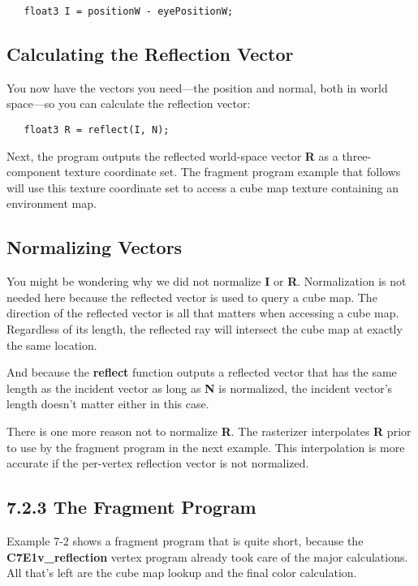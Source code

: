 \documentclass[../main.tex]{subfiles}
\begin{document}
\FloatBarrier
\begin{lstlisting}
   float3 I = positionW - eyePositionW;
\end{lstlisting}
\FloatBarrier
   
\subsection*{Calculating the Reflection Vector}

You now have the vectors you need—the position and normal, both in world space—so you can calculate the reflection vector:

\FloatBarrier
\begin{lstlisting}
   float3 R = reflect(I, N);
\end{lstlisting}
\FloatBarrier
   
Next, the program outputs the reflected world-space vector \textbf{R} as a three-component texture coordinate set. The fragment program example that follows will use this texture coordinate set to access a cube map texture containing an environment map.

\subsection*{Normalizing Vectors}

You might be wondering why we did not normalize \textbf{I} or \textbf{R}. Normalization is not needed here because the reflected vector is used to query a cube map. The direction of the reflected vector is all that matters when accessing a cube map. Regardless of its length, the reflected ray will intersect the cube map at exactly the same location.

And because the \textbf{reflect} function outputs a reflected vector that has the same length as the incident vector as long as \textbf{N} is normalized, the incident vector's length doesn't matter either in this case.

There is one more reason not to normalize \textbf{R}. The rasterizer interpolates \textbf{R} prior to use by the fragment program in the next example. This interpolation is more accurate if the per-vertex reflection vector is not normalized.

\subsection{7.2.3 The Fragment Program}

Example 7-2 shows a fragment program that is quite short, because the \textbf{C7E1v_reflection} vertex program already took care of the major calculations. All that's left are the cube map lookup and the final color calculation.
\end{document}
